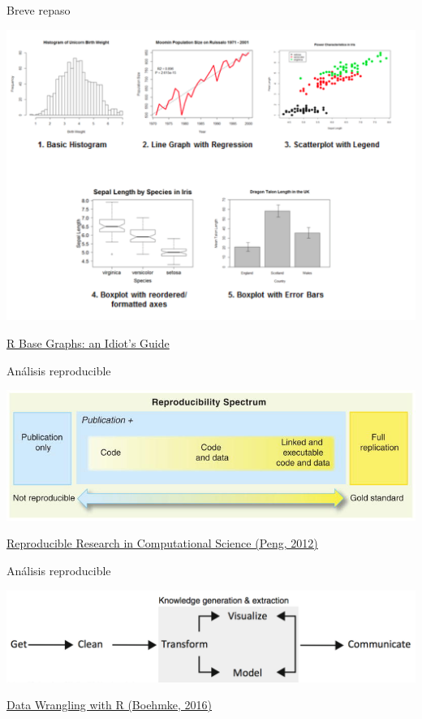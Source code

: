 \documentclass[ignorenonframetext,]{beamer}
\begin{document}
\begin{frame}{Breve repaso}
\protect\hypertarget{breve-repaso-3}{}

\includegraphics{r_base_graphs.png}

\href{https://rpubs.com/SusanEJohnston/7953}{R Base Graphs: an Idiot's
Guide}

\end{frame}

\begin{frame}{Análisis reproducible}
\protect\hypertarget{anuxe1lisis-reproducible}{}

\includegraphics{gradiente_reproducibilidad.png}

\href{https://www.ncbi.nlm.nih.gov/pmc/articles/PMC3383002/}{Reproducible
Research in Computational Science (Peng, 2012)}

\end{frame}

\begin{frame}{Análisis reproducible}
\protect\hypertarget{anuxe1lisis-reproducible-1}{}

\includegraphics{analytic_process.png}

\href{http://93.174.95.29/_ads/6F902E466A32011DD94E2B6EEE505F9F}{Data
Wrangling with R (Boehmke, 2016)}

\end{frame}
\end{document}
